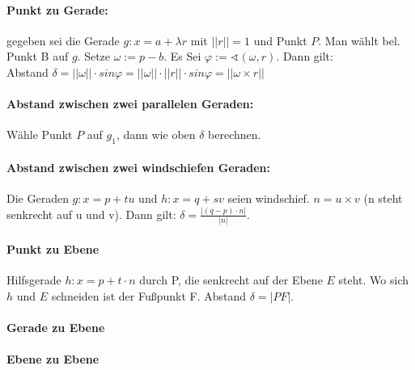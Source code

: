 \documentclass[a4paper, twocolumn]{article}
\begin{document}
      \paragraph{Punkt zu Gerade:}
      gegeben sei die Gerade $g\colon x = a + \lambda r$ mit $||r|| = 1$ und Punkt $P$. 
      Man wählt bel. Punkt B auf $g$. Setze $\omega := p-b$. 
      Es Sei $\varphi := \sphericalangle(\omega, r)$. Dann gilt:\\
      Abstand $\delta = ||\omega|| \cdot sin \varphi = ||\omega|| \cdot ||r|| \cdot sin \varphi = ||\omega \times r||$
      
      \paragraph{Abstand zwischen zwei parallelen Geraden:}
      Wähle Punkt $P$ auf $g_1$, dann wie oben $\delta$ berechnen.

      \paragraph{Abstand zwischen zwei windschiefen Geraden:}
      Die Geraden $g: x = p +  tu$ und $h: x = q + sv$ seien windschief. $n = u \times v$ (n steht senkrecht auf u und v). Dann gilt: $\delta = \frac{|(q-p) \cdot n|}{|n|}$.

      \paragraph{Punkt zu Ebene}      
      Hilfsgerade $h: x = p + t \cdot n$ durch P, die senkrecht auf der Ebene $E$ steht. Wo sich $h$ und $E$ schneiden ist der Fußpunkt F. Abstand $\delta = |PF|$.
      \paragraph{Gerade zu Ebene}
      \paragraph{Ebene zu Ebene}
   
 
\end{document}
